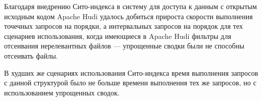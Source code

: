 Благодаря внедрению Сито-индекса в систему для доступа к данным с открытым исходным кодом Apache Hudi удалось добиться прироста скорости выполнения точечных запросов на порядки, а интервальных запросов на порядок для тех сценариев использования, когда имеющиеся в Apache Hudi фильтры для отсеивания нерелевантных файлов --- упрощенные сводки были не способны отсеивать файлы.

В худших же сценариях использования Сито-индекса время выполнения запросов с данной структурой было не больше времени выполнения тех же запросов, но с использованием упрощенных сводок.
